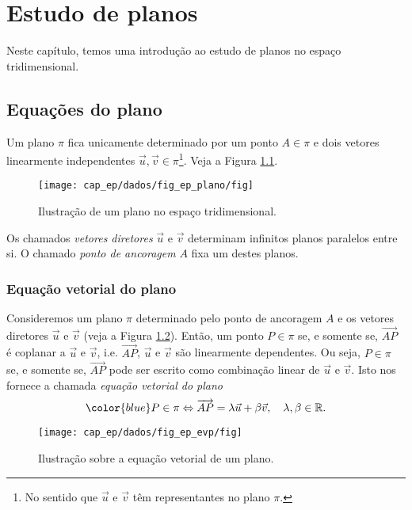 

\chapter{Estudo de planos}\label{cap_ep}
\thispagestyle{fancy}

Neste capítulo, temos uma introdução ao estudo de planos no espaço tridimensional.

\section{Equações do plano}\label{cap_ep_sec_eqsplano}

Um plano $\pi$ fica unicamente determinado por um ponto $A\in \pi$ e dois vetores linearmente independentes $\vec{u},\vec{v}\in \pi$\footnote{No sentido que $\vec{u}$ e $\vec{v}$ têm representantes no plano $\pi$.}. Veja a Figura \ref{fig:ep_plano}.

\begin{figure}[H]
  \centering
  \texttt{[image: cap\_ep/dados/fig\_ep\_plano/fig]}
  \caption{Ilustração de um plano no espaço tridimensional.}
  \label{fig:ep_plano}
\end{figure}

Os chamados \emph{vetores diretores} $\vec{u}$ e $\vec{v}$ determinam infinitos planos paralelos entre si. O chamado \emph{ponto de ancoragem} $A$ fixa um destes planos.

\subsection{Equação vetorial do plano}

Consideremos um plano $\pi$ determinado pelo ponto de ancoragem $A$ e os vetores diretores $\vec{u}$ e $\vec{v}$ (veja a Figura \ref{fig:ep_evp}). Então, um ponto $P\in \pi$ se, e somente se, $\overrightarrow{AP}$ é coplanar a $\vec{u}$ e $\vec{v}$, i.e. $\overrightarrow{AP}$, $\vec{u}$ e $\vec{v}$ são linearmente dependentes. Ou seja, $P\in\pi$ se, e somente se, $\overrightarrow{AP}$ pode ser escrito como combinação linear de $\vec{u}$ e $\vec{v}$. Isto nos fornece a chamada \emph{equação vetorial do plano}
\begin{equation}
  {\color{blue}P\in\pi \Leftrightarrow \overrightarrow{AP} = \lambda\vec{u}+\beta\vec{v},\quad\lambda,\beta\in\mathbb{R}}.
\end{equation}

\begin{figure}[H]
  \centering
  \texttt{[image: cap\_ep/dados/fig\_ep\_evp/fig]}
  \caption{Ilustração sobre a equação vetorial de um plano.}
  \label{fig:ep_evp}
\end{figure}


